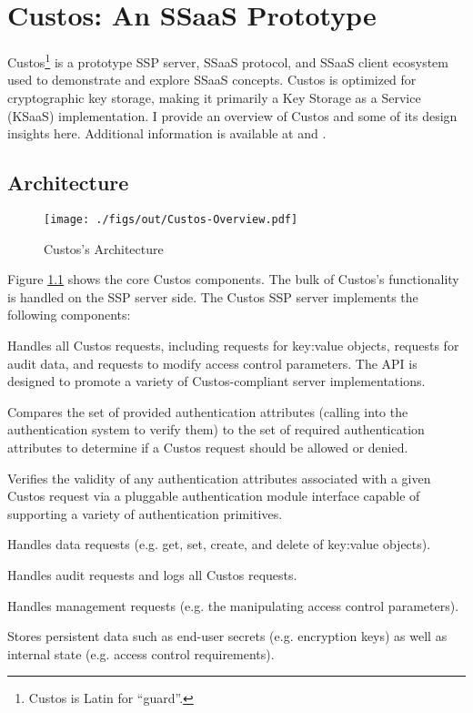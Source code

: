 \chapter{Custos: An SSaaS Prototype}
\label{chap:custos}

Custos\footnote{Custos is Latin for ``guard''.} is a prototype SSP
server, SSaaS protocol, and SSaaS client ecosystem used to demonstrate
and explore SSaaS concepts. Custos is optimized for cryptographic key
storage, making it primarily a Key Storage as a Service (KSaaS)
implementation. I provide an overview of Custos and some of its design
insights here. Additional information is available at
\cite{custos-masters} and \cite{custos-trios}.

\section{Architecture}
\label{chap:custos:arch}

\begin{figure}[t]
  \centering
  \texttt{[image: ./figs/out/Custos-Overview.pdf]}
  \caption{Custos's Architecture}
  \label{fig:custos-overview}
\end{figure}

Figure \ref{fig:custos-overview} shows the core Custos components. The
bulk of Custos's functionality is handled on the SSP server side. The
Custos SSP server implements the following components:

\begin{packed_desc}
\item[API:] Handles all Custos requests, including requests for
  key:value objects, requests for audit data, and requests to modify
  access control parameters. The API is designed to promote a variety
  of Custos-compliant server implementations.
\item[Access Control:] Compares the set of provided authentication
  attributes (calling into the authentication system to verify them)
  to the set of required authentication attributes to determine if a
  Custos request should be allowed or denied.
\item[Authentication:] Verifies the validity of any authentication
  attributes associated with a given Custos request via a pluggable
  authentication module interface capable of supporting a variety of
  authentication primitives.
\item[Data:] Handles data requests (e.g. get, set, create, and
  delete of key:value objects).
\item[Auditing:] Handles audit requests and logs all Custos
  requests.
\item[Management:] Handles management requests (e.g. the
  manipulating access control parameters).
\item[Key-Value Secret Store:] Stores persistent data such as end-user
  secrets (e.g. encryption keys) as well as internal state
  (e.g. access control requirements).
\end{packed_desc}

